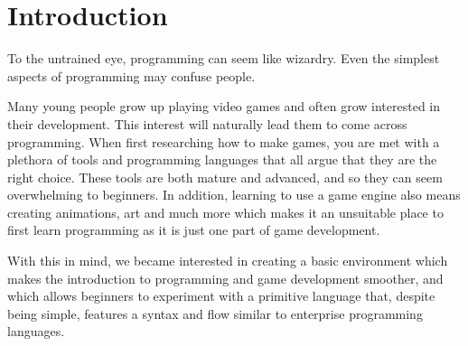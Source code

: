 \chapter{Introduction} \label{chap:introduction}
To the untrained eye, programming can seem like wizardry. Even the simplest aspects of programming may confuse people\cite{bosseWhyProgrammingDifficult2017}.

Many young people grow up playing video games and often grow interested in their development. 
This interest will naturally lead them to come across programming.
When first researching how to make games, you are met with a plethora of tools and programming languages that all argue that they are the right choice.
These tools are both mature and advanced, and so they can seem overwhelming to beginners. 
In addition, learning to use a game engine also means creating animations, art and much more which makes it an unsuitable place to first learn programming as it is just one part of game development.

With this in mind, we became interested in creating a basic environment which makes the introduction to programming and game development smoother, and which allows beginners to experiment with a primitive language that, despite being simple, features a syntax and flow similar to enterprise programming languages.